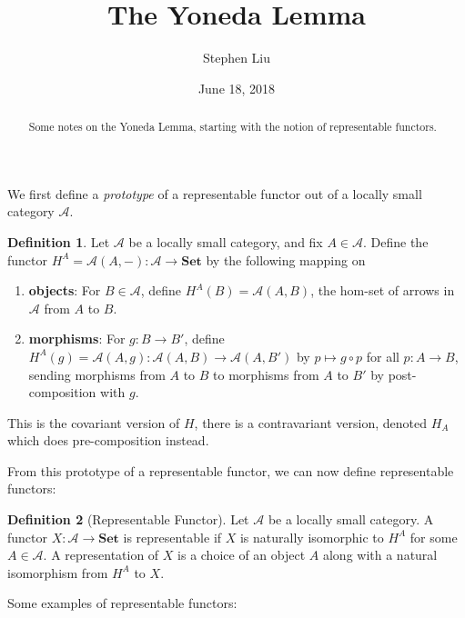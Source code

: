\documentclass[11pt]{article}
\theoremstyle{definition}
\newtheorem*{defn}{Definition}
\theoremstyle{definition}
\theoremstyle{plain}
\theoremstyle{plain}
\theoremstyle{plain}
\begin{document}
\author{Stephen Liu}
\title{The Yoneda Lemma}
\date{June 18, 2018}

\maketitle

\begin{abstract}
Some notes on the Yoneda Lemma, starting with the notion of representable functors.
\end{abstract}

We first define a \emph{prototype} of a representable functor out of a locally small category $\mathscr{A}$.

\begin{defn}
Let $\mathscr{A}$ be a locally small category, and fix $A \in \mathscr{A}$. Define the functor $H^{A}=\mathscr{A}(A, -): \mathscr{A} \to \textbf{Set}$ by the following mapping on

\begin{enumerate}
\item \textbf{objects}: For $B \in \mathscr{A}$, define $H^{A}(B) = \mathscr{A}(A,B)$, the hom-set of arrows in $\mathscr{A}$ from $A$ to $B$.
\item \textbf{morphisms}: For $g:B \to B'$, define $H^{A}(g) = \mathscr{A}(A, g): \mathscr{A}(A,B) \to \mathscr{A}(A,B')$ by $p \mapsto g \circ p$ for all $p : A \to B$, sending morphisms from $A$ to $B$ to morphisms from $A$ to $B'$ by post-composition with $g$.
\end{enumerate}
\end{defn}

This is the covariant version of $H$, there is a contravariant version, denoted $H_{A}$ which does pre-composition instead.

From this prototype of a representable functor, we can now define representable functors:

\begin{defn}[Representable Functor]
Let $\mathscr{A}$ be a locally small category. A functor $X:\mathscr{A} \to \textbf{Set}$ is representable if $X$ is naturally isomorphic to $H^{A}$ for some $A \in \mathscr{A}$. A representation of $X$ is a choice of an object $A$ along with a natural isomorphism from $H^{A}$ to $X$.
\end{defn}

Some examples of representable functors:
\end{document}

